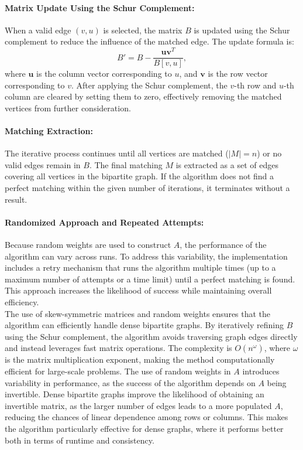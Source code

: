 \paragraph{Matrix Update Using the Schur Complement:}
When a valid edge \( (v, u) \) is selected, the matrix \( B \) is updated using the Schur complement to reduce the influence of the matched edge. The update formula is:
\[
B' = B - \frac{\mathbf{u} \mathbf{v}^T}{B[v, u]},
\]
where \( \mathbf{u} \) is the column vector corresponding to \( u \), and \( \mathbf{v} \) is the row vector corresponding to \( v \). After applying the Schur complement, the \( v \)-th row and \( u \)-th column are cleared by setting them to zero, effectively removing the matched vertices from further consideration.

\paragraph{Matching Extraction:}
The iterative process continues until all vertices are matched (\( |M| = n \)) or no valid edges remain in \( B \). The final matching \( M \) is extracted as a set of edges covering all vertices in the bipartite graph. If the algorithm does not find a perfect matching within the given number of iterations, it terminates without a result.

\paragraph{Randomized Approach and Repeated Attempts:}
Because random weights are used to construct \( A \), the performance of the algorithm can vary across runs. To address this variability, the implementation includes a retry mechanism that runs the algorithm multiple times (up to a maximum number of attempts or a time limit) until a perfect matching is found. This approach increases the likelihood of success while maintaining overall efficiency.\\

\noindent The use of skew-symmetric matrices and random weights ensures that the algorithm can efficiently handle dense bipartite graphs. By iteratively refining \( B \) using the Schur complement, the algorithm avoids traversing graph edges directly and instead leverages fast matrix operations. The complexity is \( O(n^\omega) \), where \( \omega \) is the matrix multiplication exponent, making the method computationally efficient for large-scale problems. The use of random weights in \( A \) introduces variability in performance, as the success of the algorithm depends on \( A \) being invertible. Dense bipartite graphs improve the likelihood of obtaining an invertible matrix, as the larger number of edges leads to a more populated \( A \), reducing the chances of linear dependence among rows or columns. This makes the algorithm particularly effective for dense graphs, where it performs better both in terms of runtime and consistency.



